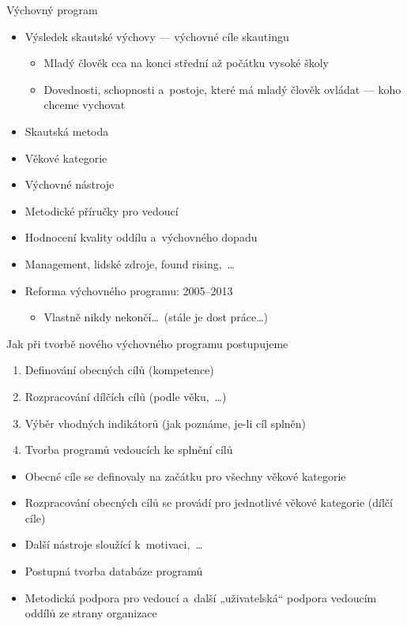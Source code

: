 \documentclass[hyperref={bookmarks=true, unicode=true, colorlinks=true, plainpages=false, pdfkeywords={Skaut, Junak, Skauting, Vychovna metoda}, linkcolor=OrangeRed, anchorcolor=OrangeRed, citecolor=RawSienna, filecolor=RawSienna, menucolor=OrangeRed, urlcolor=RawSienna, pdftex}, compress, xelatex, xcolor=dvipsnames, print]{beamer}
\begin{document}
\begin{frame}{Výchovný program}
\begin{itemize}
\item Výsledek skautské výchovy --- výchovné cíle skautingu
 \begin{itemize}
 \item Mladý člověk cca na konci střední až počátku vysoké školy
 \item Dovednosti, schopnosti a~postoje, které má mladý člověk ovládat --- koho chceme vychovat
 \end{itemize}
\item Skautská metoda
\item Věkové kategorie
\item Výchovné nástroje
\item Metodické příručky pro vedoucí
\item Hodnocení kvality oddílu a~výchovného dopadu
\item Management, lidské zdroje, found rising,~\ldots
\item Reforma výchovného programu: 2005--2013
\begin{itemize}
 \item Vlastně nikdy nekončí\ldots~(stále je dost práce\ldots)
\end{itemize}

\end{itemize}
\end{frame}

\begin{frame}{Jak při tvorbě nového výchovného programu postupujeme}
\begin{enumerate}
\item Definování obecných cílů (kompetence)
\item Rozpracování dílčích cílů (podle věku,~\ldots)
\item Výběr vhodných indikátorů (jak poznáme, je-li cíl splněn)
\item Tvorba programů vedoucích ke splnění cílů
\end{enumerate}
\begin{itemize}
\item Obecné cíle se definovaly na začátku pro všechny věkové kategorie
\item Rozpracování obecných cílů se provádí pro jednotlivé věkové kategorie (dílčí cíle)
\item Další nástroje sloužící k~motivaci,~\ldots
\item Postupná tvorba databáze programů
\item Metodická podpora pro vedoucí a~další „uživatelská“ podpora vedoucím oddílů ze strany organizace
\end{itemize}
\end{frame}
\end{document}
